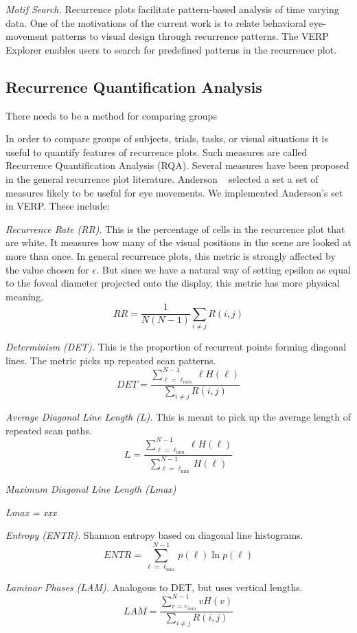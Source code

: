 \documentclass{sigchi}
\begin{document}
\emph{Motif Search.} Recurrence plots facilitate pattern-based analysis of
time varying data. One of the motivations of the current work is to relate
behavioral eye-movement patterns to visual design through recurrence
patterns. The VERP Explorer enables users to search for predefined patterns
in the recurrence plot. 



\subsection{Recurrence Quantification Analysis} 
There needs to be a method for comparing groups

In order to compare groups of subjects, trials, tasks, or visual situations it is useful to quantify features of recurrence plots. Such measures are called Recurrence Quantification Analysis (RQA).  Several measures have been proposed in the general recurrence plot literature. Anderson ~\cite{Anderson_2013} selected a set a set of measures likely to be useful for eye movements. We implemented Anderson's set in VERP. These include:

\emph{Recurrence Rate (RR).} This is the percentage of cells in the
recurrence plot that are white. It measures how many of the visual
positions in the scene are looked at more than once. In general recurrence
plots, this metric is strongly affected by the value chosen for $\epsilon$.
But since we have a natural way of setting epsilon as equal to the foveal
diameter projected onto the display, this metric has more physical meaning.
\[
	RR = {\frac{1}{N(N-1)}}{\sum_{i\neq j}{R(i,j)}}
\]

\emph{Determinism (DET).} This is the proportion of recurrent points
forming diagonal lines. The metric picks up repeated scan patterns.
\[
	DET = 
	\frac{
		\sum_{\ell=\ell_{min}}^{N-1}{\ell H(\ell)}
	}{
		\sum_{i\neq j} { R(i,j) }
	}
\]

\emph{Average Diagonal Line Length (L).} This is meant to pick up the
average length of repeated scan paths.
\[
	L = 
	\frac{
		\sum_{\ell=\ell_{\min} }^{ N-1 }{ \ell H(\ell) }
 	}{
		\sum_{\ell=\ell_{\min} }^{ N-1 }{ H(\ell) }
 	}
\]

\emph{Maximum Diagonal Line Length 
(Lmax)}

\emph{Lmax = xxx}

\emph{Entropy (ENTR).}  Shannon entropy based on diagonal line histograms.
\[
	ENTR = 
    \sum_{\ell = \ell_{\min}}^{N-1}{p(\ell)\ln p(\ell) }
\]
 
\emph{Laminar Phases (LAM).} Analogous to DET, but uses vertical lengths.
\[
	LAM =
	\frac{
		\sum_{v = v_{min} }^{N - 1} { vH(v) }
	}{
		\sum_{i\neq j}{ R(i,j)}
	}
\]
 
\end{document}
